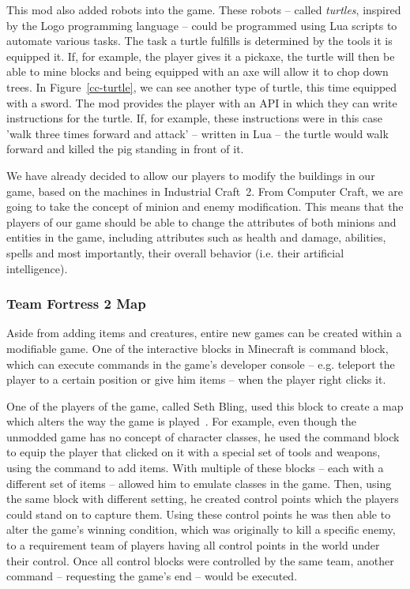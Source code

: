This mod also added robots into the game. These robots -- called \emph{turtles}, inspired by the Logo programming language -- 
could be programmed using Lua scripts to automate 
various tasks. The task a turtle fulfills is determined by the tools it is equipped it. If, for example, the player gives it a pickaxe, 
the turtle will then be able to mine blocks and being equipped with an axe will allow it to chop down trees. 
In Figure~\ref{cc-turtle}, we
can see another type of turtle, this time equipped with a sword. The mod provides the player with an API in which they can write
instructions for the turtle. If, for example, these instructions were in this case 'walk three times forward and attack' 
-- written in Lua -- the turtle would walk forward and killed the pig standing in front of it.

We have already decided to allow our players to modify the buildings in our game, based on the machines in Industrial Craft~2. 
From Computer Craft, we are going to take the concept of minion and enemy modification. This means that the players
of our game should be able to change the attributes of both minions and entities in the game, including attributes such as health and
damage, abilities, spells and most importantly, their overall behavior (i.e. their artificial intelligence).

\subsubsection{Team Fortress 2 Map}

Aside from adding items and creatures, entire new games can be created within a modifiable game.
One of the interactive blocks in Minecraft is command block,
which can execute commands in the game's developer console -- e.g. teleport the player to a certain position or give him items --
when the player right clicks it.

One of the players of the game, called Seth Bling, used this block to create a map which alters the way the game is 
played~\cite{FutureOfMinecraft}. For example, even though the 
unmodded game has no concept of character classes, he used the command block to equip the player that clicked on it with a special
set of tools and weapons, using the command to add items. With multiple of these blocks -- each with a different set of items -- 
allowed him to emulate classes in the game. Then, using the same block with different setting, he created control points which
the players could stand on to capture them. Using these control points he was then able to alter the game's winning condition, which
was originally to kill a specific enemy, to a requirement team of players having all control points in the world under their control.
Once all control blocks were controlled by the same team, another command -- requesting the game's end -- would be executed.

